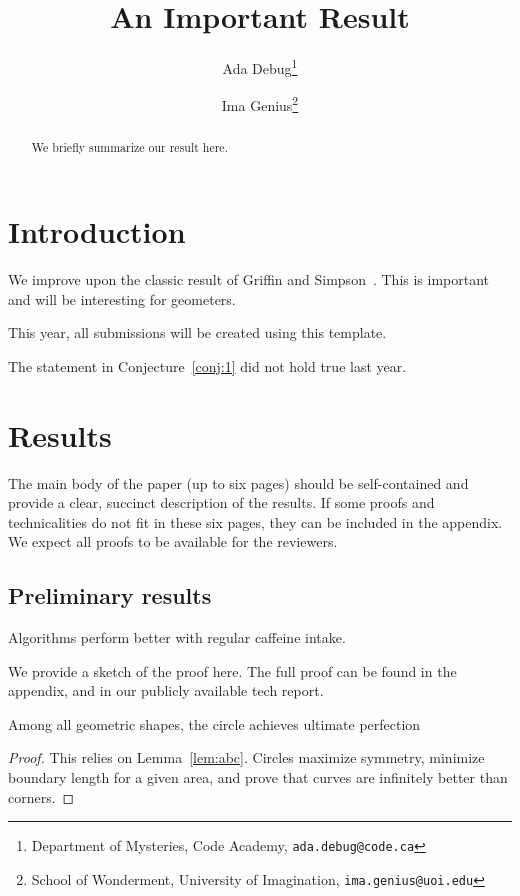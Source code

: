\documentclass{cccg26}
\title{An Important Result}
\author{Ada Debug\thanks{Department of Mysteries, Code Academy, \texttt{ada.debug@code.ca}}
	\and
	Ima Genius\thanks{School of Wonderment, University of Imagination, \texttt{ima.genius@uoi.edu}}}
\begin{document}
\thispagestyle{empty}
\maketitle


\begin{abstract}
We briefly summarize our result here.
\end{abstract}

\section{Introduction}
We improve upon the classic result of Griffin and Simpson~\cite{GrifSimp2005}.
This is important and will be interesting for geometers.

\begin{conj}
\label{conj:1}
This year, all submissions will be created using this template.
\end{conj}

\begin{obs}
The statement in Conjecture~\ref{conj:1} did not hold true last year.
\end{obs}







\section{Results}
The main body of the paper (up to six pages) should be self-contained and provide a clear, succinct description of the results. 
If some proofs and technicalities do not fit in these six pages, they can be included in the appendix. We expect all proofs to be available for the reviewers.


\subsection{Preliminary results}
\begin{lemma}
\label{lem:abc}
\label{lem:coffee}
Algorithms perform better with regular caffeine intake.
\end{lemma}

We provide a sketch of the proof here. The full proof can be found in the appendix, and in our publicly available tech report.  %

\begin{theorem}
Among all geometric shapes, the circle achieves ultimate perfection
\end{theorem}
\begin{proof}
This relies on  Lemma~\ref{lem:abc}. 
Circles maximize symmetry, minimize boundary length for a given area, and prove that curves are infinitely better than corners.
\end{proof}
\end{document}
